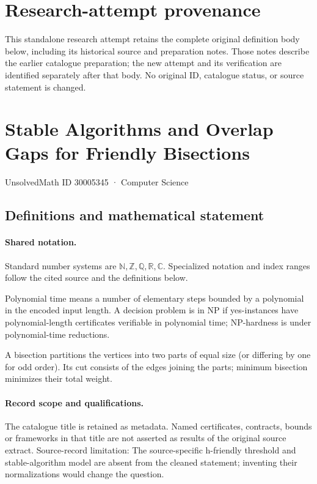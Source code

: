 \documentclass[11pt]{article}
\begin{document}
\section*{Research-attempt provenance}
This standalone research attempt retains the complete original definition body below,
including its historical source and preparation notes. Those notes describe the
earlier catalogue preparation; the new attempt and its verification are identified
separately after that body. No original ID, catalogue status, or source statement is changed.

\section{Stable Algorithms and Overlap Gaps for Friendly Bisections}\label{30005345}
{\small UnsolvedMath ID 30005345 · Computer Science}
\subsection{Definitions and mathematical statement}

\paragraph{Shared notation.}Standard number systems are $\mathbb N,\mathbb Z,\mathbb Q,\mathbb R,\mathbb C$. Specialized notation and index ranges follow the cited source and the definitions below.


Polynomial time means a number of elementary steps bounded by a polynomial in the encoded input length. A decision problem is in $\mathrm{NP}$ if yes-instances have polynomial-length certificates verifiable in polynomial time; NP-hardness is under polynomial-time reductions.

A bisection partitions the vertices into two parts of equal size (or differing by one for odd order). Its cut consists of the edges joining the parts; minimum bisection minimizes their total weight.
\paragraph{Record scope and qualifications.}
The catalogue title is retained as metadata. Named certificates, contracts, bounds or frameworks in that title are not asserted as results of the original source extract.
Source-record limitation: The source-specific h-friendly threshold and stable-algorithm model are absent from the cleaned statement; inventing their normalizations would change the question.
\end{document}
